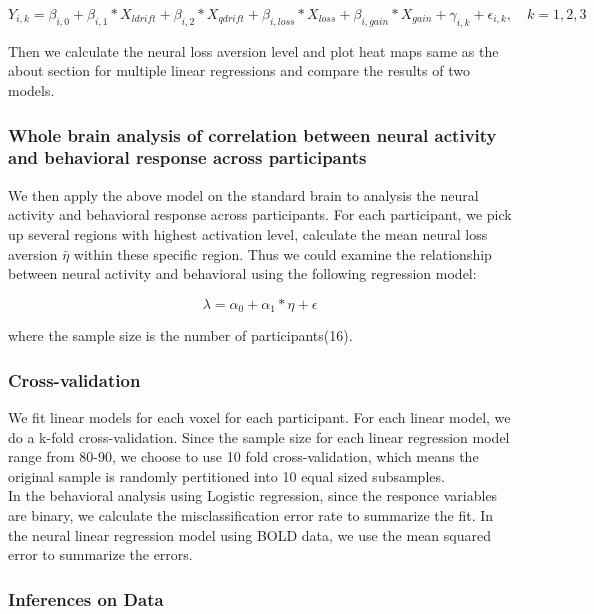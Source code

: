 \begin{equation}
Y_{i, k} = \beta_{i, 0} + \beta_{i,1} *X_{ldrift} + \beta_{i, 2} * X_{qdrift} +  \beta_{i, loss} *X_{loss} + \beta_{i, gain} * X_{gain}  + \gamma _{i, k} + \epsilon_{i, k}, \quad k =1, 2, 3
\end{equation}

Then we calculate the neural loss aversion level and plot heat maps same as the about section for multiple linear regressions and compare the results of two models.

\subsubsection{Whole brain analysis of correlation between 
neural activity and behavioral response across participants}

We then apply the above model on the standard brain to analysis the neural 
activity and behavioral response across participants. For each participant, 
we pick up several regions with highest activation level, calculate the mean 
neural loss aversion $\bar{\eta}$ within these specific region. Thus we could 
examine the relationship between neural activity and behavioral using the 
following regression model:

\begin{equation}
\lambda = \alpha_0 + \alpha_1 * \eta + \epsilon
\end{equation}

where the sample size is the number of participants(16).

\subsubsection{Cross-validation}

We fit linear models for each voxel for each participant. For each linear
model, we do a k-fold cross-validation. Since the sample size for each linear 
regression model range from 80-90, we choose to use 10 fold cross-validation,
which means the original sample is randomly pertitioned into 10 equal sized 
subsamples. \\
In the behavioral analysis using Logistic regression, since the responce 
variables are binary, we calculate the misclassification error rate to 
summarize the fit. In the neural linear regression model using BOLD data, we 
use the mean squared error to summarize the errors.

\subsubsection{Inferences on Data}

